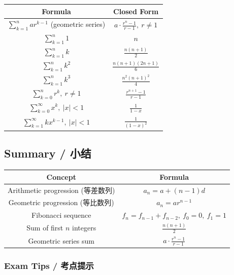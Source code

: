 \documentclass[10pt,a4paper,openany]{ctexbook}
\theoremstyle{definition}
\theoremstyle{remark}
\begin{document}
\begin{center}
\begin{tabular}{cc}
\hline
Formula & Closed Form \\ \hline
$\sum_{k=1}^{n} ar^{k-1}$ (geometric series) & $a \cdot \frac{r^n - 1}{r - 1},\ r \neq 1$ \\
$\sum_{k=1}^{n} 1$ & $n$ \\
$\sum_{k=1}^{n} k$ & $\frac{n(n+1)}{2}$ \\
$\sum_{k=1}^{n} k^2$ & $\frac{n(n+1)(2n+1)}{6}$ \\
$\sum_{k=1}^{n} k^3$ & $\frac{n^2(n+1)^2}{4}$ \\
$\sum_{k=0}^{n} r^k,\ r \neq 1$ & $\frac{r^{n+1} - 1}{r - 1}$ \\
$\sum_{k=0}^{\infty} x^k,\ |x| < 1$ & $\frac{1}{1 - x}$ \\
$\sum_{k=1}^{\infty} kx^{k-1},\ |x| < 1$ & $\frac{1}{(1-x)^2}$ \\
\hline
\end{tabular}

\end{center}

\vspace{-2pt}

\subsection{Summary / 小结}

\begin{center}
\begin{tabular}{cc}
\hline
Concept & Formula \\ \hline
Arithmetic progression (等差数列) & $a_n = a + (n-1)d$ \\
Geometric progression (等比数列) & $a_n = ar^{n-1}$ \\
Fibonacci sequence & $f_n = f_{n-1} + f_{n-2},\ f_0=0,\ f_1=1$ \\
Sum of first $n$ integers & $\frac{n(n+1)}{2}$ \\
Geometric series sum & $a \cdot \frac{r^n - 1}{r - 1}$ \\
\hline
\end{tabular}

\end{center}

\subsubsection{Exam Tips / 考点提示}
\end{document}
